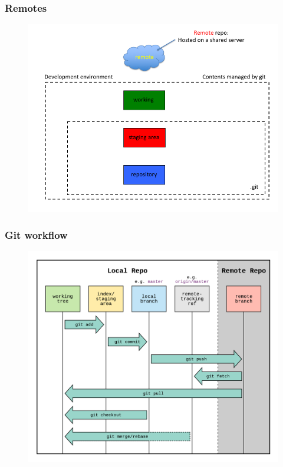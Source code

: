 \documentclass[11pt]{beamer}
\begin{document}

\begin{frame}[fragile]
\frametitle{Remotes}

\begin{figure}[htp]
 \centering
 \includegraphics[scale=0.35]{gitD.png}
\end{figure}

\end{frame}



\begin{frame}[fragile]
\frametitle{Git workflow}
\begin{figure}[htp]
 \centering
 \includegraphics[scale=0.20]{gitWorkflow.png}
\end{figure}


\end{frame}
\end{document}
